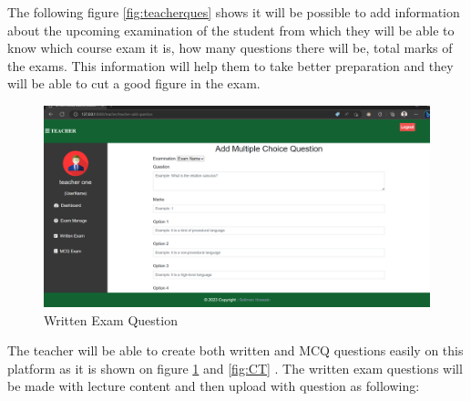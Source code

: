 The following figure \ref{fig:teacherques} shows it will be possible to add information about the upcoming examination of the student from which they will be able to know which course exam it is, how many questions there will be, total marks of the exams. This information will help them to take better preparation and they will be able to cut a good figure in the exam.
\begin{figure}[H]
    \centering
    \includegraphics[scale=.36]{img/MCQ.png}
    \caption{Written Exam Question}
    \label{fig:MCQ}
\end{figure}
The teacher will be able to create both written and MCQ questions easily on this platform as it is shown on figure \ref{fig:MCQ}  and \ref{fig:CT} . The written exam questions will be made with lecture content and then upload with question as following:

